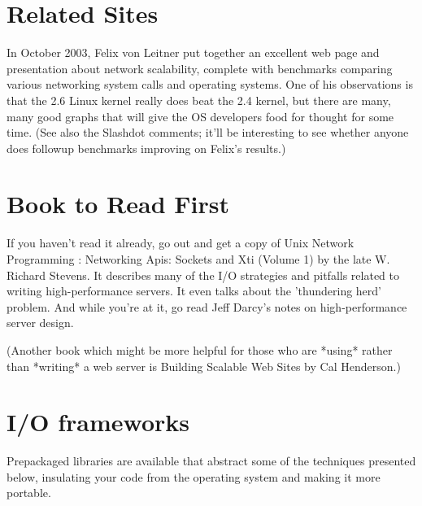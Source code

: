 \documentclass[12pt, twoside, a4paper, xetex]{report}
\begin{document}
\section*{Related Sites}

In October 2003, Felix von Leitner put together an excellent web page and presentation about network scalability, complete with benchmarks comparing various networking system calls and operating systems. One of his observations is that the 2.6 Linux kernel really does beat the 2.4 kernel, but there are many, many good graphs that will give the OS developers food for thought for some time. (See also the Slashdot comments; it'll be interesting to see whether anyone does followup benchmarks improving on Felix's results.)

\section*{Book to Read First}

If you haven't read it already, go out and get a copy of Unix Network Programming : Networking Apis: Sockets and Xti (Volume 1) by the late W. Richard Stevens. It describes many of the I/O strategies and pitfalls related to writing high-performance servers. It even talks about the 'thundering herd' problem. And while you're at it, go read Jeff Darcy's notes on high-performance server design.

(Another book which might be more helpful for those who are *using* rather than *writing* a web server is Building Scalable Web Sites by Cal Henderson.)

\section*{I/O frameworks}

Prepackaged libraries are available that abstract some of the techniques presented below, insulating your code from the operating system and making it more portable.
	
\end{document}
